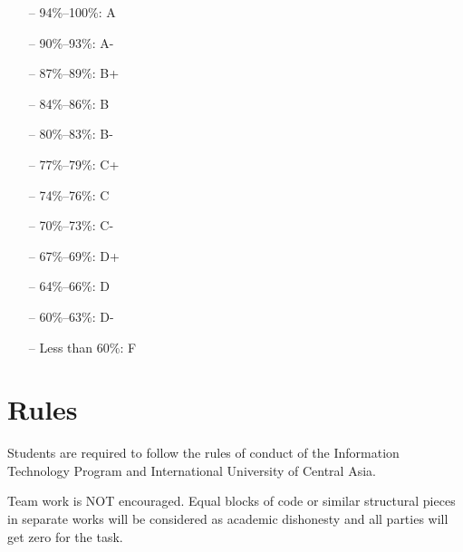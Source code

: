 \documentclass[12pt,a4paper,oneside]{article}
\begin{document}
        \begin{itemize} \itemsep-10pt \parskip0pt 
            \item[--] 94\%--100\%: A\\
            \item[--] 90\%--93\%: A-\\
            \item[--] 87\%--89\%: B+\\
            \item[--] 84\%--86\%: B\\
            \item[--] 80\%--83\%: B-\\
            \item[--] 77\%--79\%: C+\\
            \item[--] 74\%--76\%: C\\
            \item[--] 70\%--73\%: C-\\
            \item[--] 67\%--69\%: D+\\
            \item[--] 64\%--66\%: D\\
            \item[--] 60\%--63\%: D-\\
            \item[--] Less than 60\%: F
        \end{itemize}

    \section{Rules}

        Students are required to follow the rules of conduct of the Information Technology Program and International University of Central Asia.

        Team work is NOT encouraged. Equal blocks of code or similar structural
        pieces in separate works will be considered as academic dishonesty and
        all parties will get zero for the task.
\end{document}
